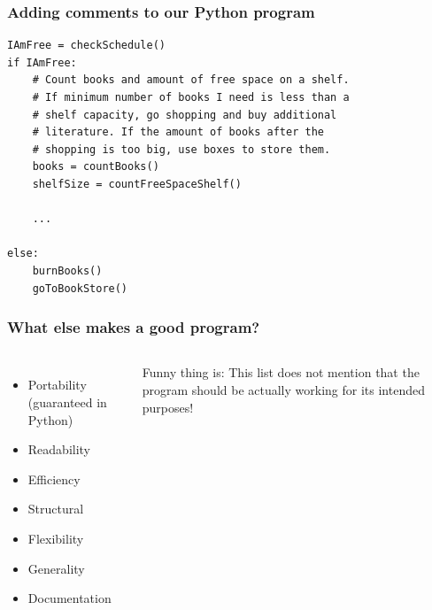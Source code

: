  \begin{frame}[fragile]
  \frametitle{Adding comments to our Python program}
  \centering{}
  \begin{lstlisting}
IAmFree = checkSchedule()
if IAmFree:
    # Count books and amount of free space on a shelf. 
    # If minimum number of books I need is less than a 
    # shelf capacity, go shopping and buy additional 
    # literature. If the amount of books after the 
    # shopping is too big, use boxes to store them.
    books = countBooks()
    shelfSize = countFreeSpaceShelf()
    
    ...
    
else:
    burnBooks()
    goToBookStore()
 \end{lstlisting}
 \end{frame}
 


\begin{frame}
  \frametitle{What else makes a good program?}
  \begin{columns}[T]
        \begin{itemize}
            \item Portability (guaranteed in Python)
            \item Readability
            \item Efficiency 
            \item Structural
            \item Flexibility
            \item Generality
            \item Documentation
        \end{itemize}
Funny thing is: This list does not mention that the program should be actually working for its intended purposes!
    \end{columns}
\end{frame}



